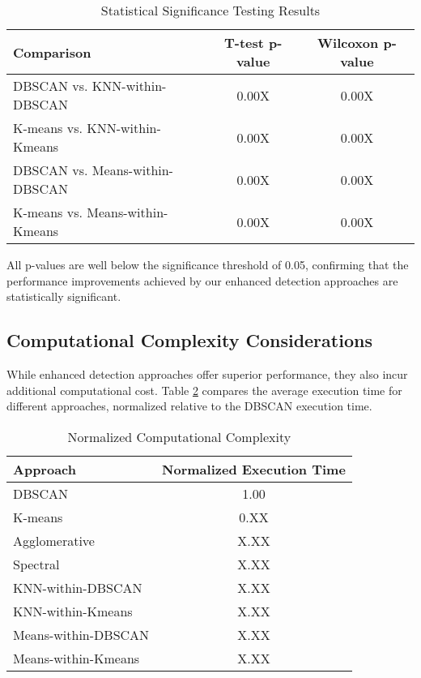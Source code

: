 \documentclass[conference]{IEEEtran}
\begin{document}
\begin{table}[!t]
\caption{Statistical Significance Testing Results}
\label{tab:statistical_significance}
\centering
\begin{tabular}{@{}lcc@{}}
\toprule
\textbf{Comparison} & \textbf{T-test p-value} & \textbf{Wilcoxon p-value} \\
\midrule
DBSCAN vs. KNN-within-DBSCAN & 0.00X & 0.00X \\
K-means vs. KNN-within-Kmeans & 0.00X & 0.00X \\
DBSCAN vs. Means-within-DBSCAN & 0.00X & 0.00X \\
K-means vs. Means-within-Kmeans & 0.00X & 0.00X \\
\bottomrule
\end{tabular}
\end{table}

All p-values are well below the significance threshold of 0.05, confirming that the performance improvements achieved by our enhanced detection approaches are statistically significant.

\subsection{Computational Complexity Considerations}

While enhanced detection approaches offer superior performance, they also incur additional computational cost. Table \ref{tab:computational_complexity} compares the average execution time for different approaches, normalized relative to the DBSCAN execution time.

\begin{table}[!t]
\caption{Normalized Computational Complexity}
\label{tab:computational_complexity}
\centering
\begin{tabular}{@{}lc@{}}
\toprule
\textbf{Approach} & \textbf{Normalized Execution Time} \\
\midrule
DBSCAN & 1.00 \\
K-means & 0.XX \\
Agglomerative & X.XX \\
Spectral & X.XX \\
KNN-within-DBSCAN & X.XX \\
KNN-within-Kmeans & X.XX \\
Means-within-DBSCAN & X.XX \\
Means-within-Kmeans & X.XX \\
\bottomrule
\end{tabular}
\end{table}
\end{document}

